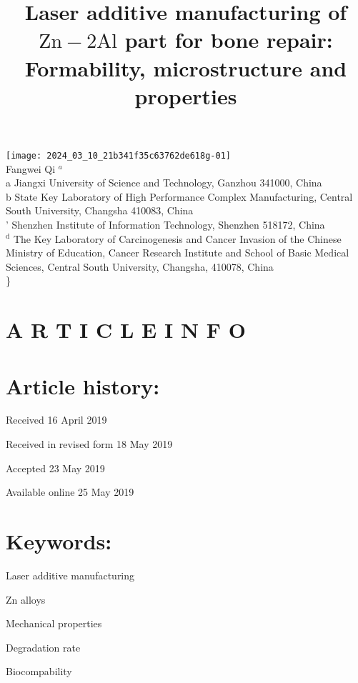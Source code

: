 \documentclass[10pt]{article}
\title{Laser additive manufacturing of $\mathrm{Zn}-2 \mathrm{Al}$ part for bone repair: Formability, microstructure and properties }
\author{}
\date{}
\begin{document}
\maketitle
\texttt{[image: 2024\_03\_10\_21b341f35c63762de618g-01]} \\
 Fangwei Qi ${ }^{a}$ \\
 a Jiangxi University of Science and Technology, Ganzhou 341000, China \\
 b State Key Laboratory of High Performance Complex Manufacturing, Central South University, Changsha 410083, China \\
 ' Shenzhen Institute of Information Technology, Shenzhen 518172, China \\
 ${ }^{\mathrm{d}}$ The Key Laboratory of Carcinogenesis and Cancer Invasion of the Chinese Ministry of Education, Cancer Research Institute and School of Basic Medical \\
 Sciences, Central South University, Changsha, 410078, China\\
\}

\section*{A R T I C L E I N F O}
\section*{Article history:}
Received 16 April 2019

Received in revised form 18 May 2019

Accepted 23 May 2019

Available online 25 May 2019

\section*{Keywords:}
Laser additive manufacturing

Zn alloys

Mechanical properties

Degradation rate

Biocompability
\end{document}
